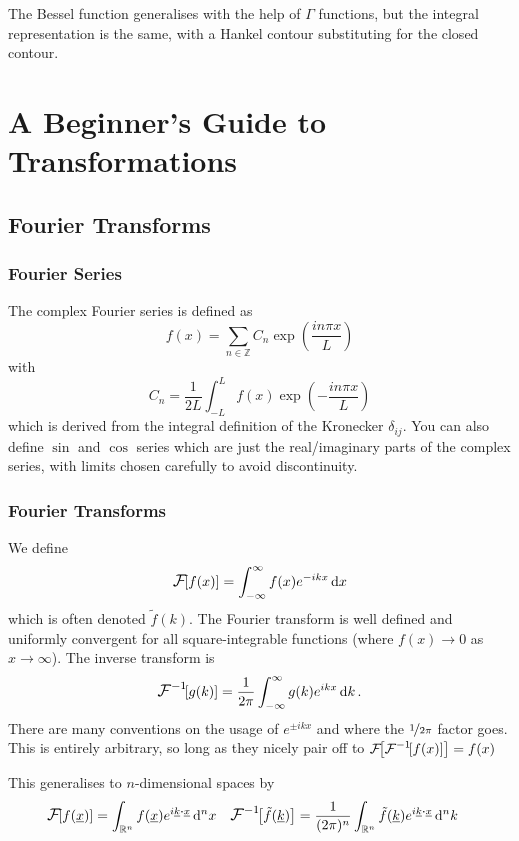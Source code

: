 \documentclass[a4paper,12pt,parskip=full,BCOR=1cm]{scrreprt}
\newcommand{\fourier}[1]{\ensuremath{\mathlarger{\mathcal{F}}\!\!\left[#1 \right]}}
\newcommand{\inversefourier}[1]{\ensuremath{\mathlarger{\mathcal{F}^{-1}}\!\!\left[#1 \right]}}
\renewcommand{\vec}{\underline}
\begin{document}
The Bessel function generalises with the help of $\Gamma$ functions, but the integral representation is the same, with a Hankel contour substituting for the closed contour.
\part{A Beginner's Guide to Transformations}
\chapter{Fourier Transforms}
\section{Fourier Series}
The complex Fourier series is defined as
\begin{equation*}
 f(x) = \sum_{n\in\mathbb{Z}} C_n\exp(\frac{in\pi x}{L})
\end{equation*}
with
$$C_n = \frac{1}{2L}\int_{-L}^L f(x)\exp(-\frac{in\pi x}{L})$$ which is derived from the integral definition of the Kronecker $\delta_{ij}$.
You can also define $\sin$ and $\cos$ series which are just the real/imaginary parts of the complex series, with limits chosen carefully to avoid discontinuity.

\section{Fourier Transforms}
We define
$$\fourier{f(x)} = \int_{-\infty}^{\infty}f(x)e^{-ikx}\dd{x}$$ which is often denoted $\tilde{f}(k)$.
The Fourier transform is well defined and uniformly convergent for all square-integrable functions (where $f(x)\rightarrow 0$ as $x\rightarrow\infty$).
The inverse transform is
\begin{equation*}
 \inversefourier{g(k)} = \frac{1}{2\pi}\int_{-\infty}^{\infty}g(k)e^{ikx}\dd{k}.
\end{equation*}
There are many conventions on the usage of $e^{\pm ikx}$ and where the $\nicefrac{1}{2\pi}$ factor goes.
This is entirely arbitrary, so long as they nicely pair off to $\fourier{\inversefourier{f(x)}}=f(x)$

This generalises to $n$-dimensional spaces by
\begin{align*}
 \fourier{f(\vec{x})} & = \int_{\mathbb{R}^n} f(\vec{x})e^{i\vec{k}\vdot\vec{x}}\dd[n]{x} & \inversefourier{\tilde f(\vec{k})} & = \frac{1}{(2\pi)^n}\int_{\mathbb{R}^n} \tilde f(\vec{k}) e^{i\vec{k}\vdot\vec{x}} \dd[n]{k}
\end{align*}
\end{document}
